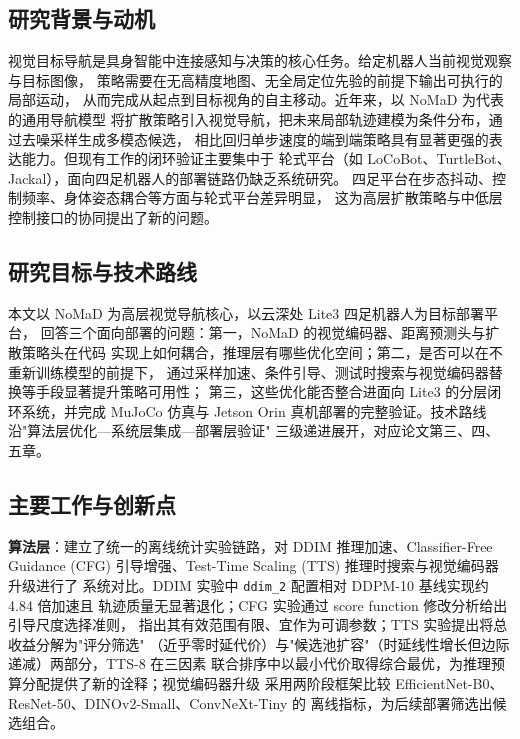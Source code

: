 

\begin{digest}[zh]

\subsection*{研究背景与动机}

视觉目标导航是具身智能中连接感知与决策的核心任务。给定机器人当前视觉观察与目标图像，
策略需要在无高精度地图、无全局定位先验的前提下输出可执行的局部运动，
从而完成从起点到目标视角的自主移动。近年来，以 NoMaD 为代表的通用导航模型
将扩散策略引入视觉导航，把未来局部轨迹建模为条件分布，通过去噪采样生成多模态候选，
相比回归单步速度的端到端策略具有显著更强的表达能力。但现有工作的闭环验证主要集中于
轮式平台（如 LoCoBot、TurtleBot、Jackal），面向四足机器人的部署链路仍缺乏系统研究。
四足平台在步态抖动、控制频率、身体姿态耦合等方面与轮式平台差异明显，
这为高层扩散策略与中低层控制接口的协同提出了新的问题。

\subsection*{研究目标与技术路线}

本文以 NoMaD 为高层视觉导航核心，以云深处 Lite3 四足机器人为目标部署平台，
回答三个面向部署的问题：第一，NoMaD 的视觉编码器、距离预测头与扩散策略头在代码
实现上如何耦合，推理层有哪些优化空间；第二，是否可以在不重新训练模型的前提下，
通过采样加速、条件引导、测试时搜索与视觉编码器替换等手段显著提升策略可用性；
第三，这些优化能否整合进面向 Lite3 的分层闭环系统，并完成 MuJoCo 仿真与
Jetson Orin 真机部署的完整验证。技术路线沿"算法层优化—系统层集成—部署层验证"
三级递进展开，对应论文第三、四、五章。

\subsection*{主要工作与创新点}

\textbf{算法层}：建立了统一的离线统计实验链路，对 DDIM 推理加速、Classifier-Free
Guidance (CFG) 引导增强、Test-Time Scaling (TTS) 推理时搜索与视觉编码器升级进行了
系统对比。DDIM 实验中 \texttt{ddim\_2} 配置相对 DDPM-10 基线实现约 4.84 倍加速且
轨迹质量无显著退化；CFG 实验通过 score function 修改分析给出引导尺度选择准则，
指出其有效范围有限、宜作为可调参数；TTS 实验提出将总收益分解为"评分筛选"
（近乎零时延代价）与"候选池扩容"（时延线性增长但边际递减）两部分，TTS-8 在三因素
联合排序中以最小代价取得综合最优，为推理预算分配提供了新的诠释；视觉编码器升级
采用两阶段框架比较 EfficientNet-B0、ResNet-50、DINOv2-Small、ConvNeXt-Tiny 的
离线指标，为后续部署筛选出候选组合。


\end{digest}
